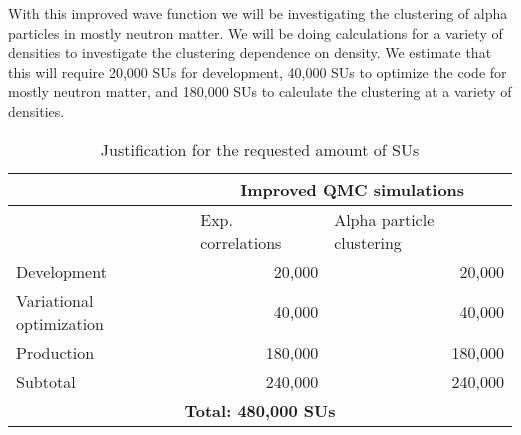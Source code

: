 \documentclass[12pt,letterpaper]{article}
\begin{document}
With this improved wave function we will be investigating the clustering of
alpha particles in mostly neutron matter. We will be doing calculations for a
variety of densities to investigate the clustering dependence on density. We
estimate that this will require 20,000 SUs for development, 40,000 SUs to
optimize the code for mostly neutron matter, and 180,000 SUs to calculate the
clustering at a variety of densities.

\begin{table}[htbp]
\centering
\caption{Justification for the requested amount of SUs}
\begin{tabular}{|l|r|r|}
\hline
 & \multicolumn{ 2}{c|}{\textbf{Improved QMC simulations}} \\ \hline
 & \multicolumn{1}{l|}{Exp. correlations} &
 \multicolumn{1}{l|}{Alpha particle clustering} \\ \hline
Development & 20,000 & 20,000 \\ \hline
Variational optimization & 40,000 & 40,000 \\ \hline
Production & 180,000 & 180,000 \\ \hline
Subtotal & 240,000 & 240,000 \\ \hline\hline
\multicolumn{ 3}{|c|}{\textbf{Total: 480,000 SUs}} \\ \hline
\end{tabular}
\label{tab:SUs}
\end{table}

{\color{red}{Lucas depending on how many SU's we want to apply for and how many you need we can adjust the above estimates.}}

\vspace{-0.5cm}


\end{document}
